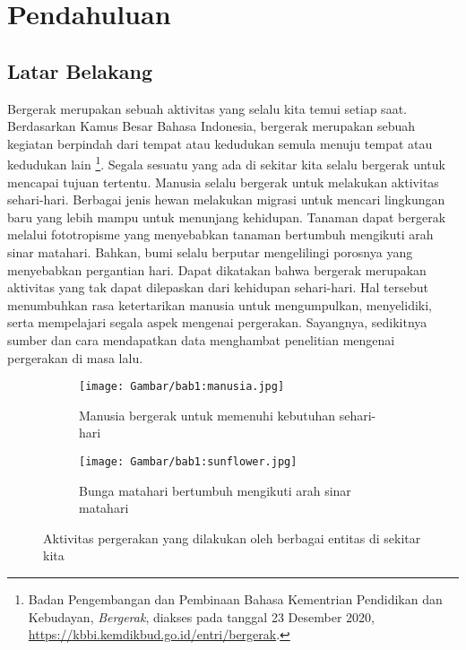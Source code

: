 \chapter{Pendahuluan}
\label{chap:intro}
   
\section{Latar Belakang}
\label{sec:label}

Bergerak merupakan sebuah aktivitas yang selalu kita temui setiap saat. Berdasarkan Kamus Besar Bahasa Indonesia, bergerak merupakan sebuah kegiatan berpindah dari tempat atau kedudukan semula menuju tempat atau kedudukan lain \footnote{Badan Pengembangan dan Pembinaan Bahasa Kementrian Pendidikan dan Kebudayan, \textit{Bergerak}, diakses pada tanggal 23 Desember 2020, \url{https://kbbi.kemdikbud.go.id/entri/bergerak}.}. Segala sesuatu yang ada di sekitar kita selalu bergerak untuk mencapai tujuan tertentu. Manusia selalu bergerak untuk melakukan aktivitas sehari-hari. Berbagai jenis hewan melakukan migrasi untuk mencari lingkungan baru yang lebih mampu untuk menunjang kehidupan. Tanaman dapat bergerak melalui fototropisme yang menyebabkan tanaman bertumbuh mengikuti arah sinar matahari. Bahkan, bumi selalu berputar mengelilingi porosnya yang menyebabkan pergantian hari. Dapat dikatakan bahwa bergerak merupakan aktivitas yang tak dapat dilepaskan dari kehidupan sehari-hari. Hal tersebut menumbuhkan rasa ketertarikan manusia untuk mengumpulkan, menyelidiki, serta mempelajari segala aspek mengenai pergerakan. Sayangnya, sedikitnya sumber dan cara mendapatkan data menghambat penelitian mengenai pergerakan di masa lalu.

\begin{figure}[h]
    \centering
    \begin{subfigure}[b]{0.45\textwidth}
        \texttt{[image: Gambar/bab1:manusia.jpg]}
        \caption{Manusia bergerak untuk memenuhi kebutuhan sehari-hari}
        \label{bab1:manusia}
    \end{subfigure}
    \begin{subfigure}[b]{0.45\textwidth}
        \texttt{[image: Gambar/bab1:sunflower.jpg]}
        \caption{Bunga matahari bertumbuh mengikuti arah sinar matahari}
        \label{bab1:wildebeest}
    \end{subfigure}
    \caption[Aktivitas pergerakan]{
    Aktivitas pergerakan yang dilakukan oleh berbagai entitas di sekitar kita}
    \label{bab1:pergerakan}
\end{figure}


